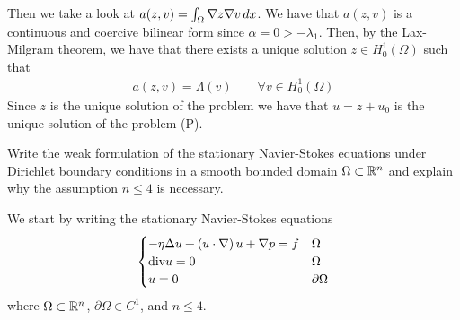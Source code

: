 \begin{enumerate}
    Then we take a look at \(a(z, v) = \int_\Omega \nabla z \nabla v \, dx\). We have that \(a(z, v)\) is a continuous and coercive bilinear form since \(\alpha = 0 > -\lambda_1\). Then, by the Lax-Milgram theorem, we have that there exists a unique solution \(z \in H^1_0(\Omega)\) such that
    \[
        \begin{split}
            a(z, v) = \Lambda(v) \qquad \forall v \in H^1_0(\Omega)
        \end{split}
    \]
    Since \(z\) is the unique solution of the problem we have that \(u = z + u_0\) is the unique solution of the problem (P).
\end{enumerate}

\newpage
\begin{exercise}
    Write the weak formulation of the stationary Navier-Stokes equations under Dirichlet boundary conditions in a smooth bounded domain \(\Omega \subset \mathbb{R}^n\) and explain why the assumption \(n \leq 4\) is necessary.
\end{exercise}
We start by writing the stationary Navier-Stokes equations
\[
    \begin{cases}
        - \eta \Delta u + \left( u \cdot \nabla \right) u + \nabla p = f & \Omega \\
        \text{div} u = 0 & \Omega \\
        u = 0 & \partial\Omega
    \end{cases}
\]
where \(\Omega \subset \mathbb{R}^n\), \(\partial\Omega \in C^1\), and \(n \leq 4\).
